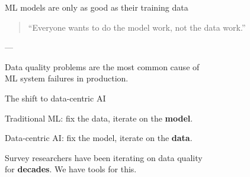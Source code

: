 \documentclass[aspectratio=169,11pt]{beamer}
\begin{document}
\begin{frame}{ML models are only as good as their training data}

\begin{quote}
``Everyone wants to do the model work, not the data work.''
\end{quote}

\vspace{0.5em}
\hfill --- \citet{sambasivan2021everyone}

\vspace{1.5em}

Data quality problems are the most common cause of\\
ML system failures in production.

\vspace{0.5em}
\hfill \citep{sculley2015hidden}
\end{frame}

\begin{frame}{The shift to data-centric AI}

Traditional ML: fix the data, iterate on the \textbf{model}.

\vspace{1em}

Data-centric AI: fix the model, iterate on the \textbf{data}.

\vspace{1.5em}

Survey researchers have been iterating on data quality\\
for \textbf{decades}. We have tools for this.

\vspace{1em}
\hfill \citep{ng2021data}
\end{frame}
\end{document}
